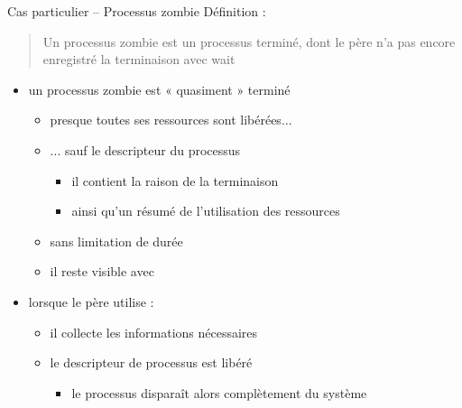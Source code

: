 \begin {frame} {Cas particulier -- Processus zombie}
    Définition :

    \begin {quote}
	Un processus zombie est un processus terminé, dont le
	père n'a pas encore enregistré la terminaison avec wait
    \end {quote}

    \begin {itemize}
	\item un processus zombie est « quasiment » terminé
	    \begin {itemize}
		\item presque toutes ses ressources sont libérées...
		\item ... sauf le descripteur du processus
		    \begin {itemize}
			\item il contient la raison de la terminaison
			\item ainsi qu'un résumé de l'utilisation
			    des ressources
		    \end {itemize}
		\item sans limitation de durée
		\item il reste visible avec 
	    \end {itemize}


	\item lorsque le père utilise  :

	    \begin {itemize}
		\item il collecte les informations nécessaires
		\item le descripteur de processus est libéré
		    \begin {itemize}
			\item le processus disparaît alors complètement
			    du système
		    \end {itemize}

	    \end {itemize}
    \end {itemize}
\end {frame}


